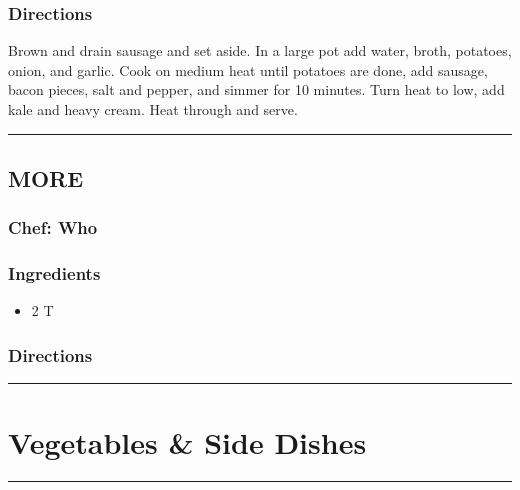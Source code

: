 \documentclass[
]{book}
\providecommand{\tightlist}{%
  \setlength{\itemsep}{0pt}\setlength{\parskip}{0pt}}
\begin{document}
\hypertarget{directions-24}{%
\subsection*{Directions}\label{directions-24}}


Brown and drain sausage and set aside. In a large pot add water, broth, potatoes, onion, and garlic. Cook on medium heat until potatoes are done, add sausage, bacon pieces, salt and pepper, and simmer for 10 minutes. Turn heat to low, add kale and heavy cream. Heat through and serve.

\begin{center}\rule{0.5\linewidth}{0.5pt}\end{center}

\hypertarget{more}{%
\section*{MORE}\label{more}}


\hypertarget{chef-who}{%
\subsection*{Chef: Who}\label{chef-who}}


\hypertarget{ingredients-25}{%
\subsection*{Ingredients}\label{ingredients-25}}


\begin{itemize}
\tightlist
\item
  2 T
\end{itemize}

\hypertarget{directions-25}{%
\subsection*{Directions}\label{directions-25}}


\begin{center}\rule{0.5\linewidth}{0.5pt}\end{center}

\hypertarget{Sides}{%
\chapter{Vegetables \& Side Dishes}\label{Sides}}

\begin{center}\rule{0.5\linewidth}{0.5pt}\end{center}
\end{document}
